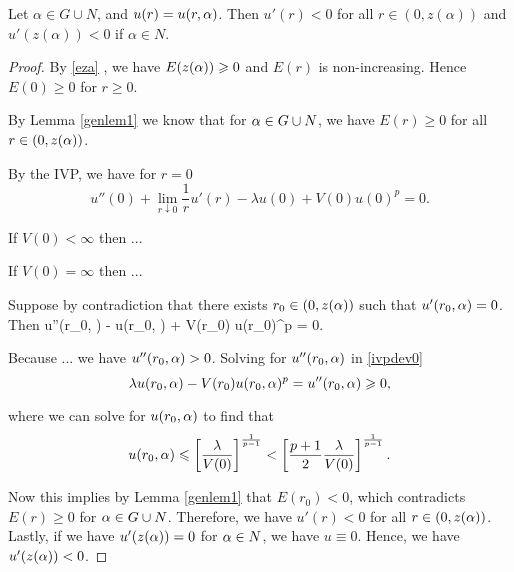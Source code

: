 \begin{lemma}\label{genlem2}
Let $\alpha \in G \cup N$, and $u(r) = u(r, \alpha)$. Then $u'(r) < 0$ for all
$r \in (0, z(\alpha))$ and $u'(z(\alpha)) < 0$ if $\alpha \in N$.
\end{lemma}
\begin{proof}
By \cref{eza} 
, we have $E(z(\alpha)) \geqslant 0$ and $E(r)$ is non-increasing. 
Hence $E(0) \geq 0$ for $r \geq 0$.

By Lemma \ref{genlem1} we know that for $\alpha \in G \cup N$, we have $E(r) \geq
0$ for all $r \in (0, z(\alpha))$.

By the IVP, we have for $r=0$
\[ u''(0) + \underset{r \downarrow 0}{\lim} \frac{1}{r} u'(r) -
\lambda u(0) + V(0) u(0)^p = 0. \]

If $V(0) < \infty$ then ...

If $V(0) = \infty$ then ...

Suppose by contradiction that there exists $r_0 \in (0,z(\alpha))$ such that $u'(r_0,
\alpha)=0$. Then %
\be \label{ivpdev0} 
u''(r_0, \a) - \lambda u(r_0, \a) + V(r_0) u(r_0)^p = 0. 
\ee

Because ... we have $u''(r_0, \alpha) > 0$. Solving for $u''(r_0, \alpha)$ in
\eqref{ivpdev0} 
\[ \lambda u(r_0,\alpha) - V(r_0) u(r_0,\alpha)^p = u''(r_0, \alpha) \geqslant 0, \]

where we can solve for $u(r_0, \alpha)$ to find that
\[ u(r_0, \alpha) \leqslant \left[ \frac{\lambda}{V(0)} \right]^{\frac{1}{p-1}} <
\left[ \frac{p+1}{2} \frac{\lambda}{V(0)} \right]^{\frac{1}{p-1}}. \]

Now this implies by Lemma \ref{genlem1} that $E(r_0) < 0$, which contradicts
$E(r) \geq 0$ for $\alpha \in G \cup N$. Therefore, we have $u'(r) < 0$ for all $r
\in (0, z(\alpha))$. Lastly, if we have $u'(z(\alpha)) = 0$ for $\alpha \in N$, we have $u
\equiv 0$. Hence, we have $u'(z(\alpha)) < 0$.

\end{proof}

